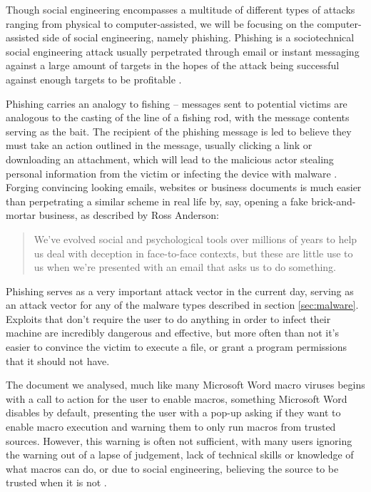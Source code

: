 Though social engineering encompasses a multitude of different types of attacks ranging from physical to
computer-assisted, we will be focusing on the computer-assisted side of social engineering, namely phishing.
Phishing is a sociotechnical social engineering attack usually perpetrated through email or instant messaging 
against a large amount of targets in the hopes of the attack being successful against enough targets to be 
profitable \cite{advanced-social-engineering-attacks}. 

Phishing carries an analogy to fishing -- messages sent to potential victims are analogous to the casting of 
the line of a fishing rod, with the message contents serving as the bait. 
The recipient of the phishing message is led to believe they must take an action outlined in the message,
usually clicking a link or downloading an attachment, which will lead to the malicious actor stealing
personal information from the victim or infecting the device with malware \cite{state-of-phishing}.
Forging convincing looking emails, websites or business documents is much easier than perpetrating a similar 
scheme in real life by, say, opening a fake brick-and-mortar business, as described by Ross Anderson:
\begin{quote}
  We’ve evolved social and psychological tools over millions of years to help
  us deal with deception in face-to-face contexts, but these are little use to us
  when we’re presented with an email that asks us to do something. \cite{anderson-security-engineering}
\end{quote}

Phishing serves as a very important attack vector in the current day, serving as an attack vector for any of the malware
types described in section \ref{sec:malware}. Exploits that don't require the user to do anything in order to infect
their machine are incredibly dangerous and effective, but more often than not it's easier to convince the victim to
execute a file, or grant a program permissions that it should not have.

The document we analysed, much like many Microsoft Word macro viruses begins with a call to action for the user to
enable macros, something Microsoft Word disables by default, presenting the user with a pop-up asking if they want to
enable macro execution and warning them to only run macros from trusted sources. However, this warning is often not
sufficient, with many users ignoring the warning out of a lapse of judgement, lack of technical skills or knowledge of
what macros can do, or due to social engineering, believing the source to be trusted when it is not
\cite{macro-viruses-users}.

